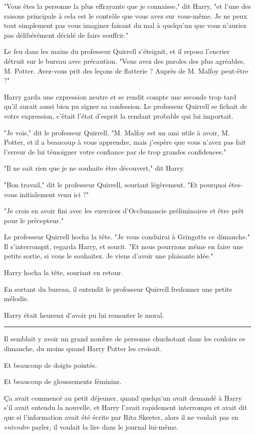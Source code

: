 "Vous êtes la personne la plus effrayante que je connaisse," dit Harry, "et l'une des raisons principale à cela est le contrôle que vous avez sur vous-même. Je ne peux tout simplement pas vous imaginer faisant du mal à quelqu'un que vous n'auriez pas délibérément décidé de faire souffrir."

Le feu dans les mains du professeur Quirrell s'éteignit, et il reposa l'encrier détruit sur le bureau avec précaution. "Vous avez des paroles des plus agréables, M. Potter. Avez-vous prit des leçons de flatterie ? Auprès de M. Malfoy peut-être ?"

Harry garda une expression neutre et se rendit compte une seconde trop tard qu'il aurait aussi bien pu signer sa confession. Le professeur Quirrell se fichait de votre expression, c'était l'état d'esprit la rendant probable qui lui importait.

"Je vois," dit le professeur Quirrell. "M. Malfoy est un ami utile à avoir, M. Potter, et il a beaucoup à vous apprendre, mais j'espère que vous n'avez pas fait l'erreur de lui témoigner votre confiance par de trop grandes confidences."

"Il ne sait rien que je ne souhaite être découvert," dit Harry.

"Bon travail," dit le professeur Quirrell, souriant légèrement. "Et pourquoi étes-vous initialement venu ici ?"

"Je crois en avoir fini avec les exercices d'Occlumancie préliminaires et être prêt pour le précepteur."

Le professeur Quirrell hocha la tête. "Je vous conduirai à Gringotts ce dimanche." Il s'interrompit, regarda Harry, et sourit. "Et nous pourrions même en faire une petite sortie, si vous le souhaitez. Je viens d'avoir une plaisante idée."

Harry hocha la tête, souriant en retour.

En sortant du bureau, il entendit le professeur Quirrell fredonner une petite mélodie.

Harry était heureux d'avoir pu lui remonter le moral.
\par\noindent\rule{\textwidth}{0.4pt}
Il semblait y avoir un grand nombre de personne chuchotant dans les couloirs ce dimanche, du moins quand Harry Potter les croisait.

Et beaucoup de doigts pointés.

Et beaucoup de gloussements féminins.

Ça avait commencé au petit déjeuner, quand quelqu'un avait demandé à Harry s'il avait entendu la nouvelle, et Harry l'avait rapidement interrompu et avait dit que si l'information avait été écrite par Rita Skeeter, alors il ne voulait pas en \emph{entendre}  parler, il voulait la lire dans le journal lui-même.

